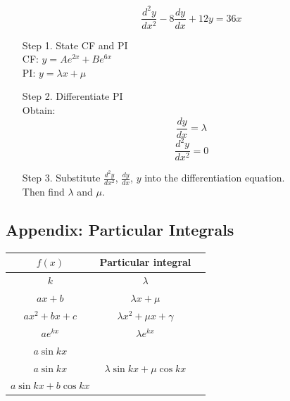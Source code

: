 \documentclass[a4paper,9pt]{scrartcl}
\begin{document}
    \begin{itemize}
        \item []\begin{displaymath}
                    \frac{d^{2}y}{dx^2} -8\frac{dy}{dx} + 12y = 36x
        \end{displaymath}

        \item [Step 1.] State CF and PI\\
        CF: $y = Ae^{2x}+Be^{6x}$\\
        PI: $y = {\lambda}x + \mu$\\

        \item [Step 2.] Differentiate PI\\
        Obtain: \\
        \begin{displaymath}
            \frac{dy}{dx} = \lambda
        \end{displaymath}
        \begin{displaymath}
            \frac{d^{2}y}{dx^2} = 0
        \end{displaymath}

        \item [Step 3.] Substitute $\frac{d^{2}y}{dx^2}$, $\frac{dy}{dx}$, $y$ into the differentiation equation.\\
        Then find $\lambda$ and $\mu$.
    \end{itemize}

    \subsection{Appendix: Particular Integrals}
    \begin{tabular}{|c|c|c|}
        \hline $f(x)$         & Particular integral                                  \\
        \hline $k$            & $\lambda$                                            \\
        \hline $ax+b$         & ${\lambda}x+\mu$                                     \\
        \hline $ax^2+bx+c$    & ${\lambda}x^2+{\mu}x+\gamma$                         \\
        \hline $ae^{kx}$      & ${\lambda}e^{kx}$                                    \\
        \hline $a\sin{kx}$    & \multirow{3}{*}{${\lambda}\sin{kx}+{\mu}{\cos{kx}}$} \\
        $a\sin{kx}$           &                                                      \\
        $a\sin{kx}+b\cos{kx}$ &                                                      \\
        \hline
    \end{tabular}
\end{document}
